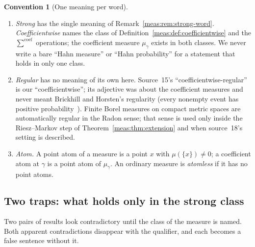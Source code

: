 \documentclass[11pt]{article}
\numberwithin{equation}{section}
\theoremstyle{definition}
\newtheorem{convention}[theorem]{Convention}
\theoremstyle{remark}
\newcommand{\csum}{\mathop{\sum}\nolimits^{\mathrm{coef}}}
\begin{document}
\begin{convention}[One meaning per word]
\begin{enumerate}[label=(\alph*)]
nonzero members has positive valuation. (Source~10 called this a
positive-order family.)
\item \emph{Strong} has the single meaning of Remark~\ref{meas:rem:strong-word}.
\emph{Coefficientwise} names the class of
Definition~\ref{meas:def:coefficientwise} and the $\csum$ operations; the
coefficient measure $\mu_\gamma$ exists in both classes. We never write a bare
``Hahn measure'' or ``Hahn probability'' for a statement that holds in only
one class.
\item \emph{Regular} has no meaning of its own here. Source~15's
``coefficientwise-regular'' is our ``coefficientwise''; its adjective was
about the coefficient measures and never meant Brickhill and Horsten's
regularity (every nonempty event has positive probability~\cite{BH}). Finite
Borel measures on compact metric spaces are automatically regular in the
Radon sense; that sense is used only inside the Riesz--Markov step of
Theorem~\ref{meas:thm:extension} and when source~18's setting is described.
\item \emph{Atom.} A point atom of a measure is a point $x$ with
$\mu(\{x\})\ne0$; a coefficient atom at $\gamma$ is a point atom of $\mu_\gamma$.
An ordinary measure is \emph{atomless} if it has no point atoms.
\end{enumerate}
\end{convention}

\subsection{Two traps: what holds only in the strong class}\label{meas:sub:traps}

Two pairs of results look contradictory until the class of the measure is
named. Both apparent contradictions disappear with the qualifier, and each
becomes a false sentence without it.
\end{document}
